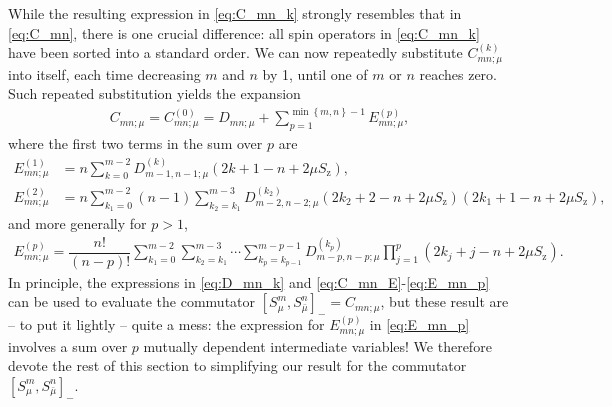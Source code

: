 \documentclass[aps,notitlepage,nofootinbib,11pt]{revtex4-1}
\newcommand{\f}[2]{\dfrac{#1}{#2}} %
\newcommand{\p}[1]{\left(#1\right)} %
\renewcommand{\sp}[1]{\left[#1\right]} %
\renewcommand{\set}[1]{\left\{#1\right\}} %
\newcommand{\z}{\text{z}}
\newcommand{\bmu}{{\bar\mu}}
\newcommand{\1}{\mathds{1}}
\begin{document}
While the resulting expression in \eqref{eq:C_mn_k} strongly resembles
that in \eqref{eq:C_mn}, there is one crucial difference: all spin
operators in \eqref{eq:C_mn_k} have been sorted into a standard order.
We can now repeatedly substitute $C_{mn;\mu}^{(k)}$ into itself, each
time decreasing $m$ and $n$ by 1, until one of $m$ or $n$ reaches
zero.  Such repeated substitution yields the expansion
\begin{align}
  C_{mn;\mu}
  = C_{mn;\mu}^{(0)}
  = D_{mn;\mu}
  + \sum_{p=1}^{\min\set{m,n}-1} E_{mn;\mu}^{(p)},
  \label{eq:C_mn_E}
\end{align}
where the first two terms in the sum over $p$ are
\begin{align}
  E_{mn;\mu}^{(1)}
  &= n \sum_{k=0}^{m-2} D_{m-1,n-1;\mu}^{(k)} \p{2k+1-n+2\mu S_\z}, \\
  E_{mn;\mu}^{(2)}
  &= n \sum_{k_1=0}^{m-2} \p{n-1} \sum_{k_2=k_1}^{m-3}
  D_{m-2,n-2;\mu}^{(k_2)} \p{2k_2+2-n+2\mu S_\z} \p{2k_1+1-n+2\mu S_\z},
\end{align}
and more generally for $p>1$,
\begin{align}
  E_{mn;\mu}^{(p)}
  = \f{n!}{\p{n-p}!}
  \sum_{k_1=0}^{m-2} \sum_{k_2=k_1}^{m-3} \cdots\sum_{k_p=k_{p-1}}^{m-p-1}
  D_{m-p,n-p;\mu}^{(k_p)} \prod_{j=1}^p \p{2k_j+j-n+2\mu S_\z}.
  \label{eq:E_mn_p}
\end{align}
In principle, the expressions in \eqref{eq:D_mn_k} and
\eqref{eq:C_mn_E}-\eqref{eq:E_mn_p} can be used to evaluate the
commutator $\sp{S_\mu^m,S_\bmu^n}_- = C_{mn;\mu}$, but these result
are -- to put it lightly -- quite a mess: the expression for
$E_{mn;\mu}^{(p)}$ in \eqref{eq:E_mn_p} involves a sum over $p$
mutually dependent intermediate variables!  We therefore devote the
rest of this section to simplifying our result for the commutator
$\sp{S_\mu^m,S_\bmu^n}_-$.
\end{document}
